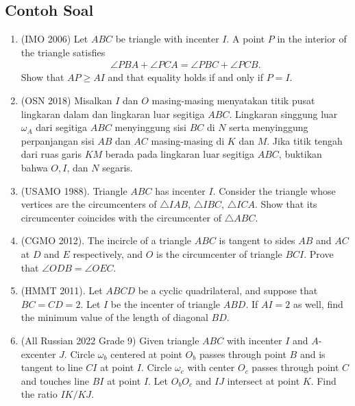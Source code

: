 \documentclass[12pt]{scrartcl}
\begin{document}
\subsection{Contoh Soal}
\begin{enumerate}
\item (IMO 2006) Let $ABC$ be triangle with incenter $I$. A point $P$ in the interior of the triangle satisfies
\begin{align*}
    \angle PBA + \angle PCA = \angle PBC + \angle PCB.
\end{align*}
Show that $AP \ge AI$ and that equality holds if and only if $P=I$.

\item (OSN 2018) Misalkan $I$ dan $O$ masing-masing menyatakan titik pusat lingkaran dalam dan lingkaran luar segitiga $ABC$. Lingkaran singgung luar $\omega_A$ dari segitiga $ABC$ menyinggung sisi $BC$ di $N$ serta menyinggung perpanjangan sisi $AB$ dan $AC$ masing-masing di $K$ dan $M$. Jika titik tengah dari ruas garis $KM$ berada pada lingkaran luar segitiga $ABC$, buktikan bahwa $O,I$, dan $N$ segaris.

\item (USAMO 1988). Triangle $ABC$ has incenter $I$. Consider the triangle whose vertices are the circumcenters of $\triangle IAB$, $\triangle IBC$, $\triangle ICA$. Show that its circumcenter coincides with the circumcenter of $\triangle ABC$.

\item (CGMO 2012). The incircle of a triangle $ABC$ is tangent to sides $AB$ and $AC$ at $D$ and $E$ respectively, and $O$ is the circumcenter of triangle $BCI$. Prove that $\angle ODB = \angle OEC$.

\item (HMMT 2011). Let $ABCD$ be a cyclic quadrilateral, and suppose that $BC = CD = 2$. Let $I$ be the incenter of triangle $ABD$. If $AI = 2$ as well, find the minimum value of the length of diagonal $BD$.

\item (All Russian 2022 Grade 9) Given triangle $ABC$ with incenter $I$ and $A$-excenter $J$. Circle $\omega_b$ centered at point $O_b$ passes through point $B$ and is tangent to line $CI$ at point $I$. Circle $\omega_c$ with center $O_c$ passes through point $C$ and touches line $BI$ at point $I$. Let $O_bO_c$ and $IJ$ intersect at point $K$. Find the ratio $IK/KJ$.
\end{enumerate}
\end{document}
